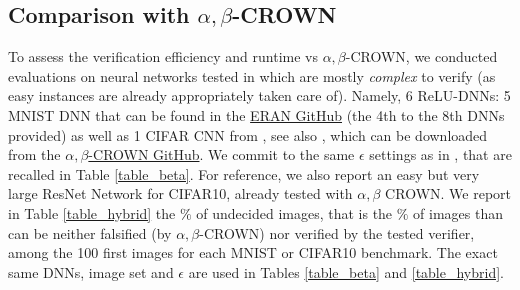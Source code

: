 






\subsection{Comparison with $\alpha,\beta$-CROWN}

To assess the verification efficiency and runtime vs $\alpha,\beta$-CROWN, we 
conducted evaluations  on neural networks tested in \cite{crown} which are mostly {\em complex} to verify (as easy instances are already appropriately taken care of). Namely, 6 ReLU-DNNs: 5 MNIST DNN that can be found in the \href{https://github.com/eth-sri/eran}{ERAN GitHub} 
(the 4th to the 8th DNNs provided) as well as 1 CIFAR CNN from 
\cite{AdversarialTrainingAndProvableDefenses}, see also \cite{SDPFI}, 
which can be downloaded from the \href{https://github.com/Verified-Intelligence/alpha-beta-CROWN}{$\alpha,\beta$-CROWN GitHub}. 
We commit to the same $\epsilon$ settings as in \cite{crown}, that are recalled in Table \ref{table_beta}. 
For reference, we also report an easy but very large ResNet Network for CIFAR10, already tested with $\alpha,\beta$ CROWN. 
We report in Table \ref{table_hybrid} the $\%$ of undecided images, that is the $\%$ of images than can be neither falsified (by $\alpha,\beta$-CROWN) nor verified by the tested verifier, among the 100 first images for each MNIST or CIFAR10 benchmark. 
The exact same DNNs, image set and $\epsilon$ are used in Tables \ref{table_beta} and \ref{table_hybrid}.


